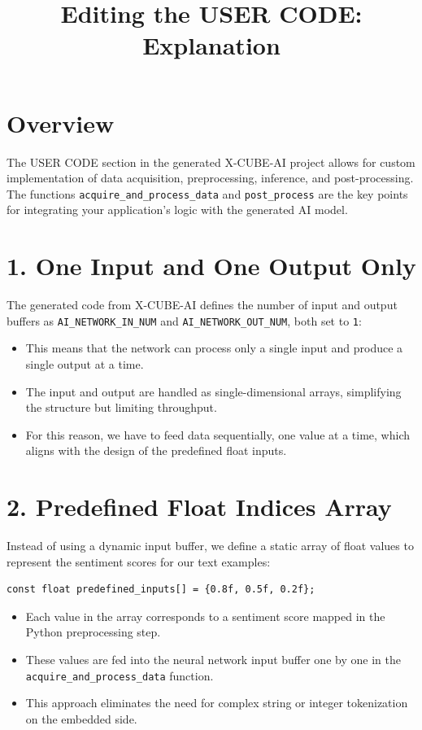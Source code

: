 \documentclass{article}
\title{Editing the USER CODE: Explanation}
\begin{document}
\maketitle

\section*{Overview}

The USER CODE section in the generated X-CUBE-AI project allows for custom implementation of data acquisition, preprocessing, inference, and post-processing. The functions \texttt{acquire\_and\_process\_data} and \texttt{post\_process} are the key points for integrating your application’s logic with the generated AI model.

\section*{1. One Input and One Output Only}
The generated code from X-CUBE-AI defines the number of input and output buffers as \texttt{AI\_NETWORK\_IN\_NUM} and \texttt{AI\_NETWORK\_OUT\_NUM}, both set to \texttt{1}:
\begin{itemize}
    \item This means that the network can process only a single input and produce a single output at a time.
    \item The input and output are handled as single-dimensional arrays, simplifying the structure but limiting throughput.
    \item For this reason, we have to feed data sequentially, one value at a time, which aligns with the design of the predefined float inputs.
\end{itemize}

\section*{2. Predefined Float Indices Array}
Instead of using a dynamic input buffer, we define a static array of float values to represent the sentiment scores for our text examples:
\begin{verbatim}
const float predefined_inputs[] = {0.8f, 0.5f, 0.2f};
\end{verbatim}
\begin{itemize}
    \item Each value in the array corresponds to a sentiment score mapped in the Python preprocessing step.
    \item These values are fed into the neural network input buffer one by one in the \texttt{acquire\_and\_process\_data} function.
    \item This approach eliminates the need for complex string or integer tokenization on the embedded side.
\end{itemize}
\end{document}
